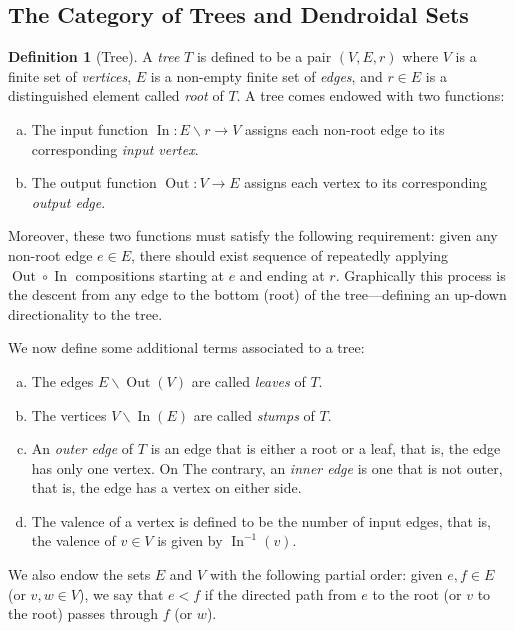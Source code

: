 \documentclass[11pt, reqno]{amsart}
\theoremstyle{definition}
\newtheorem{definition}[theorem]{Definition}
\renewcommand{\setminus}{\smallsetminus}
\DeclareMathOperator{\Input}{In}
\DeclareMathOperator{\Output}{Out}
\begin{document}
\subsection{The Category of Trees and Dendroidal Sets}

\begin{definition}[Tree]
\label{def:tree-operad}
A \emph{tree} \(T\) is defined to be a pair \((V, E, r)\) where \(V\) is a
finite set of \emph{vertices}, \(E\) is a non-empty finite set of \emph{edges},
and \(r \in E\) is a distinguished element called \emph{root} of \(T\). A tree
comes endowed with two functions:
\begin{enumerate}[(a)]\setlength\itemsep{0em}
\item The input function \(\Input: E \setminus r \to V\) assigns each non-root
    edge to its corresponding \emph{input vertex}.

\item The output function \(\Output: V \to E\) assigns each vertex to its
    corresponding \emph{output edge}.
\end{enumerate}
Moreover, these two functions must satisfy the following requirement: given any
non-root edge \(e \in E\), there should exist sequence of repeatedly applying
\(\Output \circ \Input\) compositions starting at \(e\) and ending at \(r\).
Graphically this process is the descent from any edge to the bottom (root) of
the tree---defining an up-down directionality to the tree.

We now define some additional terms associated to a tree:
\begin{enumerate}[(a)]\setlength\itemsep{0em}
\item The edges \(E \setminus \Output(V)\) are called \emph{leaves} of \(T\).

\item The vertices \(V \setminus \Input(E)\) are called \emph{stumps} of \(T\).

\item An \emph{outer edge} of \(T\) is an edge that is either a root or a
  leaf, that is, the edge has only one vertex. On The contrary, an \emph{inner
  edge} is one that is not outer, that is, the edge has a vertex on either
  side.

\item The valence of a vertex is defined to be the number of input edges, that
    is, the valence of \(v \in V\) is given by \(\Input^{-1}(v)\).
\end{enumerate}
We also endow the sets \(E\) and \(V\) with the following partial order: given
\(e, f \in E\) (or \(v, w \in V\)), we say that \(e < f\) if the directed path
from \(e\) to the root (or \(v\) to the root) passes through \(f\) (or \(w\)).
\end{definition}
\end{document}
